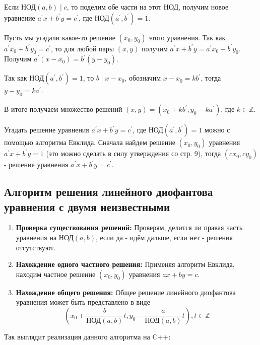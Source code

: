 \documentclass[12pt, a4paper, openany]{book}
\begin{document}
Если $\text{НОД}(a, b) \mid c$, то поделим обе части на этот НОД, получим новое уравнение $a^{'}x + b^{'}y = c^{'}$, где $\text{НОД}(a^{'}, b^{'}) = 1$.

Пусть мы угадали какое-то решение $(x_0, y_0)$ этого уравнения. Так как $a^{'}x_0 + b^{'}y_0 = c^{'}$, то для любой пары $(x, y)$ получим $a^{'}x + b^{'}y = a^{'}x_0 + b^{'}y_0$. Получим $a^{'}(x - x_0) = b^{'}(y-y_0)$.

Так как $\text{НОД}(a^{'}, b^{'}) = 1$, то $b \mid x - x_0$, обозначим $x - x_0 = kb^{'}$, тогда $y - y_0 = ka^{'}$.

\noindent
В итоге получаем множество решений $(x, y) = (x_0 + kb^{'}, y_0 - ka^{'})$, где $k \in \mathbb{Z}$.

Угадать решение уравнения $a^{'}x + b^{'}y = c^{'}$, где $\text{НОД}(a^{'}, b^{'}) = 1$ можно с помощью алгоритма Евклида. Сначала найдем решение $(x_0, y_0)$ уравнения $a^{'}x + b^{'}y = 1$ (это можно сделать в силу утверждения со стр. 9), тогда $(cx_0, cy_0)$ - решение уравнения $a^{'}x + b^{'}y = c^{'}$.

\subsection{Алгоритм решения линейного диофантова уравнения с двумя неизвестными}

\begin{enumerate}
    \item \textbf{Проверка существования решений:} Проверям, делится ли правая часть уравнения на $\text{НОД}(a, b)$, если да - идём дальше, если нет - решения отсутствуют.
    \item \textbf{Нахождение одного частного решения:} Применяя алгоритм Евклида, находим частное решение $(x_0, y_0)$ уравнения $ax + by = c$.
    \item \textbf{Нахождение общего решения:} Общее решение линейного диофантова уравнения может быть представлено в виде \\
    \[(x_0 + \frac{b}{\text{НОД}(a, b)} t, y_0 - \frac{a}{\text{НОД}(a, b)} t), t \in \mathbb{Z}\]
\end{enumerate}

\newpage
\noindent
Так выглядит реализация данного алгоритма на C++:
\end{document}
